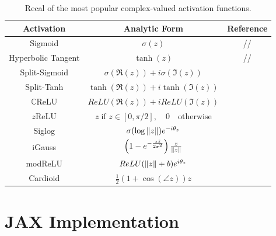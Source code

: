 \documentclass[../main.tex]{subfiles}
\begin{document}
\begin{table}[!ht]
\centering
\begin{tabular}{c c c}
\toprule
\textbf{Activation} & \textbf{Analytic Form} & \textbf{Reference}\\
\midrule
Sigmoid & $\sigma(z)$ & // \\
Hyperbolic Tangent & $\tanh(z)$ & // \\
Split-Sigmoid & $\sigma(\Re(z)) + i\sigma(\Im(z))$ & \cite{Nitta_complexBP}\\
Split-Tanh & $\tanh(\Re(z)) + i\tanh(\Im(z))$ & \cite{Nitta_complexBP}\\
$\mathds{C}$ReLU & $ReLU(\Re(z)) + iReLU(\Im(z))$ & \cite{trabelsi2018deep} \\
$z$ReLU & $z\;\text{if } z\in[0,\pi/2],\quad0\quad\text{otherwise}$ & \cite{guberman2016complex} \\
Siglog & $\sigma(\log\norm{z})e^{-i\theta_z}$ & \cite{Koutsougeras_siglog} \\
iGauss & $\left(1-e^{-\frac{z\bar{z}}{2\sigma^2}}\right)\frac{z}{\norm{z}}$ & \cite{Virtue:EECS-2019-126}\\
modReLU & $ReLU(\norm{z} + b)e^{i\theta_z}$ & \cite{DBLP:journals/corr/ArjovskySB15} \\
Cardioid & $\frac{1}{2}\left(1 + \cos(\angle z)\right)z$ & \cite{Virtue:EECS-2019-126}\\
\bottomrule
\end{tabular}
\caption{Recal of the most popular complex-valued activation functions.}
\label{tab:cmplx_activations}
\end{table}

\section{JAX Implementation}
\end{document}
